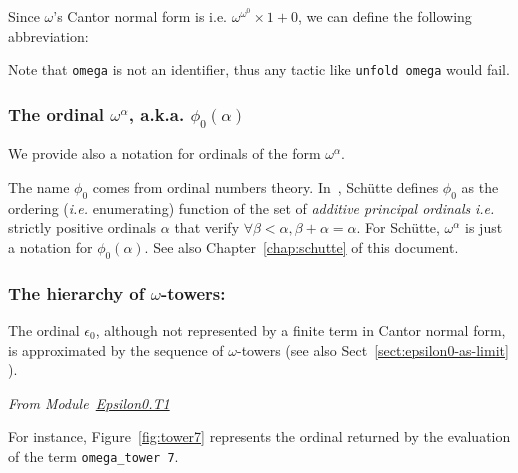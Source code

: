   Since \(\omega\)'s Cantor normal form is
i.e. \(\omega^{\omega^0}\times 1+ 0\), we can define the following abbreviation:

\label{sect:omega-notation2}




Note that \texttt{omega} is not an identifier, thus any tactic like \texttt{unfold omega} would fail.


\subsubsection{The ordinal \(\omega^\alpha\), a.k.a. \(\phi_0(\alpha)\)}
\label{sect:notation-phi0}
We provide also a notation for ordinals of the form $\omega^\alpha$.






\begin{remark}
\label{sec:orgheadline69}
The name \(\phi_0\)
   comes from ordinal numbers theory. In~\cite{schutte}, Schütte defines 
$\phi_0$  as the ordering (\emph{i.e.} enumerating) function of the set  of \emph{additive principal ordinals} \emph{i.e.} strictly positive ordinals $\alpha$ that verify $\forall \beta<\alpha, \beta+\alpha=\alpha$. For Schütte,  $\omega^\alpha$ is just a notation for $\phi_0(\alpha)$.  See also Chapter~\ref{chap:schutte} of this document.
\end{remark}



  
\subsubsection{The hierarchy of \(\omega\)-towers:}
\label{sec:orgheadline71}

The ordinal $\epsilon_0$, although not represented by a finite term in Cantor normal form, is approximated by the sequence of $\omega$-towers (see also Sect~\vref{sect:epsilon0-as-limit} ).

\vspace{4pt}
\emph{From Module~\href{../theories/html/hydras.Epsilon0.T1.html}{Epsilon0.T1}}




For instance, Figure~\ref{fig:tower7} represents  the ordinal returned by the
 evaluation of the term \texttt{omega\_tower 7}.

